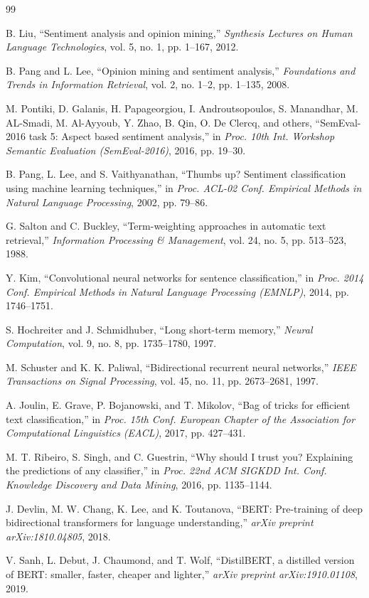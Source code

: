 \documentclass[conference]{IEEEtran}
\begin{document}
\begin{thebibliography}{99}

B. Liu, ``Sentiment analysis and opinion mining,'' \textit{Synthesis Lectures on Human Language Technologies}, vol. 5, no. 1, pp. 1--167, 2012.

B. Pang and L. Lee, ``Opinion mining and sentiment analysis,'' \textit{Foundations and Trends in Information Retrieval}, vol. 2, no. 1--2, pp. 1--135, 2008.

M. Pontiki, D. Galanis, H. Papageorgiou, I. Androutsopoulos, S. Manandhar, M. AL-Smadi, M. Al-Ayyoub, Y. Zhao, B. Qin, O. De Clercq, and others, ``SemEval-2016 task 5: Aspect based sentiment analysis,'' in \textit{Proc. 10th Int. Workshop Semantic Evaluation (SemEval-2016)}, 2016, pp. 19--30.

B. Pang, L. Lee, and S. Vaithyanathan, ``Thumbs up? Sentiment classification using machine learning techniques,'' in \textit{Proc. ACL-02 Conf. Empirical Methods in Natural Language Processing}, 2002, pp. 79--86.

G. Salton and C. Buckley, ``Term-weighting approaches in automatic text retrieval,'' \textit{Information Processing \& Management}, vol. 24, no. 5, pp. 513--523, 1988.

Y. Kim, ``Convolutional neural networks for sentence classification,'' in \textit{Proc. 2014 Conf. Empirical Methods in Natural Language Processing (EMNLP)}, 2014, pp. 1746--1751.

S. Hochreiter and J. Schmidhuber, ``Long short-term memory,'' \textit{Neural Computation}, vol. 9, no. 8, pp. 1735--1780, 1997.

M. Schuster and K. K. Paliwal, ``Bidirectional recurrent neural networks,'' \textit{IEEE Transactions on Signal Processing}, vol. 45, no. 11, pp. 2673--2681, 1997.

A. Joulin, E. Grave, P. Bojanowski, and T. Mikolov, ``Bag of tricks for efficient text classification,'' in \textit{Proc. 15th Conf. European Chapter of the Association for Computational Linguistics (EACL)}, 2017, pp. 427--431.


M. T. Ribeiro, S. Singh, and C. Guestrin, ``Why should I trust you? Explaining the predictions of any classifier,'' in \textit{Proc. 22nd ACM SIGKDD Int. Conf. Knowledge Discovery and Data Mining}, 2016, pp. 1135--1144.

J. Devlin, M. W. Chang, K. Lee, and K. Toutanova, ``BERT: Pre-training of deep bidirectional transformers for language understanding,'' \textit{arXiv preprint arXiv:1810.04805}, 2018.

V. Sanh, L. Debut, J. Chaumond, and T. Wolf, ``DistilBERT, a distilled version of BERT: smaller, faster, cheaper and lighter,'' \textit{arXiv preprint arXiv:1910.01108}, 2019.

\end{thebibliography}
\end{document}
